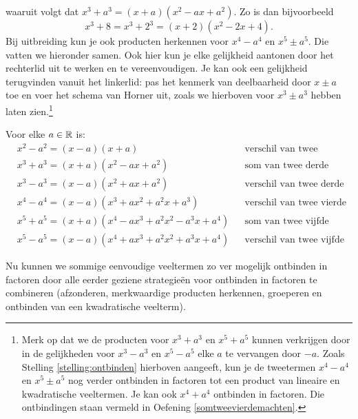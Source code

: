 \documentclass{ximera}
\begin{document}
waaruit volgt dat  $x^3 + a^3 = (x+a)(x^2-ax+a^2)$. Zo is dan bijvoorbeeld
\[
x^3+8 = x^3 + 2^3 = (x+2)(x^2-2x+4).
\]
Bij uitbreiding kun je ook producten herkennen voor $x^4-a^4$ en $x^5 \pm a^5$. Die vatten we hieronder samen. Ook hier kun je elke gelijkheid aantonen door het rechterlid uit te werken en te vereenvoudigen. Je kan ook een gelijkheid terugvinden vanuit het linkerlid: pas het kenmerk van deelbaarheid door $x \pm a$ toe en voer het schema van Horner uit, zoals we hierboven voor $x^3 \pm a^3$ hebben laten zien.\footnote{Merk op dat we de producten voor $x^3 + a^3$ en $x^5 + a^5$ kunnen verkrijgen door in de gelijkheden voor $x^3 - a^3$ en $x^5 - a^5$ elke $a$ te vervangen door $-a$. Zoals Stelling \ref{stelling:ontbinden} hierboven aangeeft, kun je de tweetermen $x^4 - a^4$ en $x^5 \pm a^5$ nog verder ontbinden in factoren tot een product van lineaire en kwadratische veeltermen. Je kan ook $x^4+a^4$ ontbinden in factoren. Die ontbindingen staan vermeld in Oefening \ref{somtweevierdemachten}.} 
	
\begin{proposition} 
Voor elke $a \in \mathbb{R}$ is:
\begin{align*}
& x^2 - a^2 = (x-a)(x+a) && \text{verschil van twee kwadraten} \\
& x^3 + a^3 = (x+a)(x^2 - ax + a^2) && \text{som van twee derde machten} \\
& x^3 - a^3 = (x-a)(x^2 + ax + a^2) && \text{verschil van twee derde machten} \\
& x^4 - a^4 = (x-a)(x^3 + ax^2 + a^2x + a^3) && \text{verschil van twee vierde machten} \\
& x^5 + a^5 = (x+a)(x^4 - ax^3 + a^2x^2 - a^3x + a^4) && \text{som van twee vijfde machten} \\
& x^5 - a^5 = (x-a)(x^4 + ax^3 + a^2x^2 + a^3x + a^4) && \text{verschil van twee vijfde machten.}
\end{align*}
\end{proposition} 



Nu kunnen we sommige eenvoudige veeltermen zo ver mogelijk ontbinden in factoren door alle eerder geziene strategieën voor ontbinden in factoren te combineren (afzonderen, merkwaardige producten herkennen, groeperen en ontbinden van een kwadratische veelterm).
\end{document}

